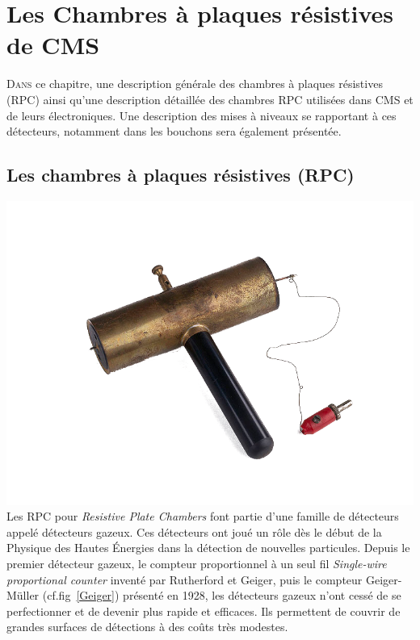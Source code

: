 \chapter{Les Chambres à plaques résistives de CMS}
\renewcommand\chapterillustration{RPC/rpc}
\ThisULCornerWallPaper{1}{\chapterillustration}
\minitoc

\lettrine[lines=4, slope=-0.5em]{D}{ans} ce chapitre, une description générale des chambres à plaques résistives (RPC) ainsi qu'une description détaillée des chambres RPC utilisées dans CMS et de leurs électroniques. Une description des mises à niveaux se rapportant à ces détecteurs, notamment dans les bouchons sera également présentée.

\section{Les chambres à plaques résistives (RPC)}

 \marginpar
{
	\centering
	\includegraphics[width=\marginparwidth]{RPC/Geiger.png}
	\label{Geiger}
}
Les RPC pour \textit{Resistive Plate Chambers} font partie d'une famille de détecteurs appelé détecteurs gazeux. Ces détecteurs ont joué un rôle dès le début de la Physique des Hautes Énergies dans la détection de nouvelles particules. Depuis le premier détecteur gazeux, le compteur proportionnel à un seul fil \textit{Single-wire proportional counter} inventé par Rutherford et Geiger, puis le compteur Geiger-Müller (cf.fig~\ref{Geiger}) présenté en 1928, les détecteurs gazeux n'ont cessé de se perfectionner et de devenir plus rapide et efficaces. Ils permettent de couvrir de grandes surfaces de détections à des coûts très modestes.

